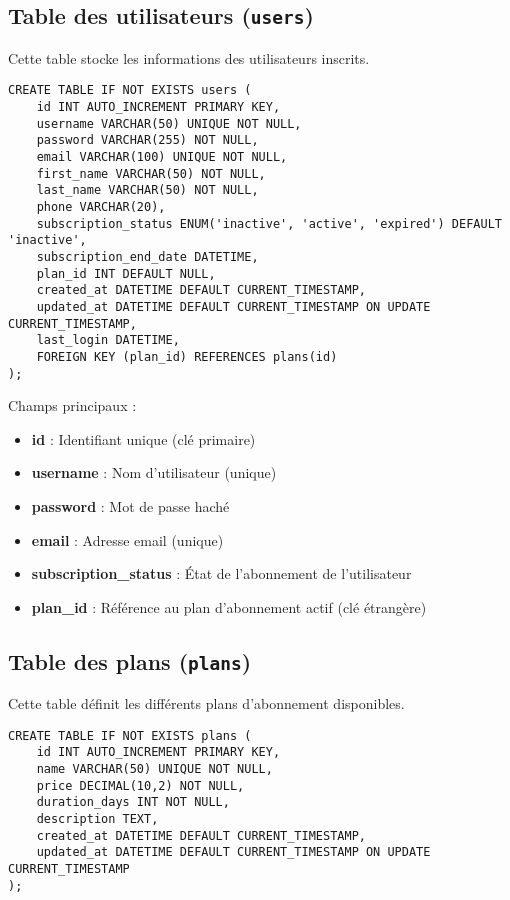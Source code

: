 \documentclass[12pt,a4paper]{report}
\begin{document}
\subsection{Table des utilisateurs (\texttt{users})}

Cette table stocke les informations des utilisateurs inscrits.

\begin{lstlisting}[style=sqlStyle, caption=Structure de la table users]
CREATE TABLE IF NOT EXISTS users (
    id INT AUTO_INCREMENT PRIMARY KEY,
    username VARCHAR(50) UNIQUE NOT NULL,
    password VARCHAR(255) NOT NULL,
    email VARCHAR(100) UNIQUE NOT NULL,
    first_name VARCHAR(50) NOT NULL,
    last_name VARCHAR(50) NOT NULL,
    phone VARCHAR(20),
    subscription_status ENUM('inactive', 'active', 'expired') DEFAULT 'inactive',
    subscription_end_date DATETIME,
    plan_id INT DEFAULT NULL,
    created_at DATETIME DEFAULT CURRENT_TIMESTAMP,
    updated_at DATETIME DEFAULT CURRENT_TIMESTAMP ON UPDATE CURRENT_TIMESTAMP,
    last_login DATETIME,
    FOREIGN KEY (plan_id) REFERENCES plans(id)
);
\end{lstlisting}

Champs principaux :
\begin{itemize}
    \item \textbf{id} : Identifiant unique (clé primaire)
    \item \textbf{username} : Nom d'utilisateur (unique)
    \item \textbf{password} : Mot de passe haché
    \item \textbf{email} : Adresse email (unique)
    \item \textbf{subscription\_status} : État de l'abonnement de l'utilisateur
    \item \textbf{plan\_id} : Référence au plan d'abonnement actif (clé étrangère)
\end{itemize}

\subsection{Table des plans (\texttt{plans})}

Cette table définit les différents plans d'abonnement disponibles.

\begin{lstlisting}[style=sqlStyle, caption=Structure de la table plans]
CREATE TABLE IF NOT EXISTS plans (
    id INT AUTO_INCREMENT PRIMARY KEY,
    name VARCHAR(50) UNIQUE NOT NULL,
    price DECIMAL(10,2) NOT NULL,
    duration_days INT NOT NULL,
    description TEXT,
    created_at DATETIME DEFAULT CURRENT_TIMESTAMP,
    updated_at DATETIME DEFAULT CURRENT_TIMESTAMP ON UPDATE CURRENT_TIMESTAMP
);
\end{lstlisting}
\end{document}
